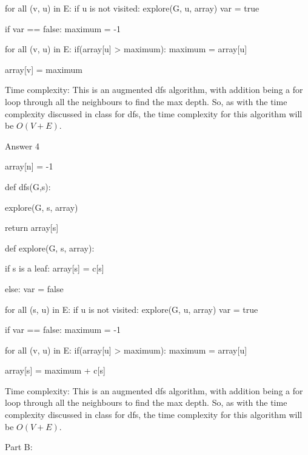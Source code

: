 \documentclass{exam}
\begin{document}
        for all (v, u) in E:
            if u is  not visited:
                explore(G, u, array)
                var = true
                
        if var == false:
            maximum = -1
            
            for all (v, u) in E:
                if(array[u] > maximum):
                    maximum = array[u]
                    
            array[v] = maximum
            
Time complexity: This is an augmented dfs algorithm, with addition being a for loop through all the neighbours to find the max depth. So, as with the time complexity discussed in class for dfs, the time complexity for this algorithm will be $O(V+E).$
\vspace{0.1in}




\vspace{0.3in}


Answer 4

array[n] = {-1}

def dfs(G,s):
    
    explore(G, s, array)
            
    
    return array[s]
    


def explore(G, s, array):
     
    if s is a leaf:
        array[s] = c[s]
        
    else:
        var = false
        
        for all (s, u) in E:
            if u is not visited:
                explore(G, u, array)
                var = true
                
        if var == false:
            maximum = -1
            
            for all (v, u) in E:
                if(array[u] > maximum):
                    maximum = array[u]
                    
            array[s] = maximum + c[s]
            
Time complexity: This is an augmented dfs algorithm, with addition being a for loop through all the neighbours to find the max depth. So, as with the time complexity discussed in class for dfs, the time complexity for this algorithm will be $O(V+E).$


Part B: 










 
\end{document}
